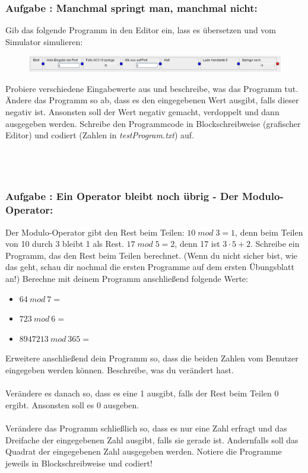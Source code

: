 \documentclass[a4paper,12pt]{article}
\newcounter{aufgnr}
\begin{document}
\subsubsection*{Aufgabe \theaufgnr: Manchmal springt man, manchmal nicht:}
Gib das folgende Programm in den Editor ein, lass es übersetzen und vom Simulator simulieren:
\begin{figure}[h]
\centering
\includegraphics[scale=.47]{ConditionalJump.png}
\end{figure}
Probiere verschiedene Eingabewerte aus und beschreibe, was das Programm tut.\\
Ändere das Programm so ab, dass es den eingegebenen Wert ausgibt, falls dieser negativ ist. Ansonsten soll der Wert negativ gemacht, verdoppelt und dann ausgegeben werden. Schreibe den Programmcode in Blockschreibweise (grafischer Editor) und codiert (Zahlen in \textit{testProgram.txt}) auf.\\
\\
\\
\\


\subsubsection*{Aufgabe \theaufgnr: Ein Operator bleibt noch übrig - Der Modulo-Operator:}
Der Modulo-Operator gibt den Rest beim Teilen: $10 \; mod \; 3 = 1$, denn beim Teilen von 10 durch 3 bleibt 1 als Rest. $17 \; mod \; 5 = 2$, denn 17 ist $3 \cdot 5 + 2$. Schreibe ein Programm, das den Rest beim Teilen berechnet. (Wenn du nicht sicher bist, wie das geht, schau dir nochmal die ersten Programme auf dem ersten Übungsblatt an!) Berechne mit deinem Programm anschließend folgende Werte:
\begin{itemize}
\item $64~ mod~ 7 =$
\item $723~ mod~ 6 =$
\item $8947213~ mod~ 365 =$
\end{itemize}
Erweitere anschließend dein Programm so, dass die beiden Zahlen vom Benutzer eingegeben werden können. Beschreibe, was du verändert hast.\\
\\
Verändere es danach so, dass es eine 1 ausgibt, falls der Rest beim Teilen 0 ergibt. Ansonsten soll es 0 ausgeben.\\
\\
Verändere das Programm schließlich so, dass es nur eine Zahl erfragt und das Dreifache der eingegebenen Zahl ausgibt, falls sie gerade ist. Andernfalls soll das Quadrat der eingegebenen Zahl ausgegeben werden. Notiere die Programme jeweils in Blockschreibweise und codiert!\\
\\
\\
\\
\end{document}
